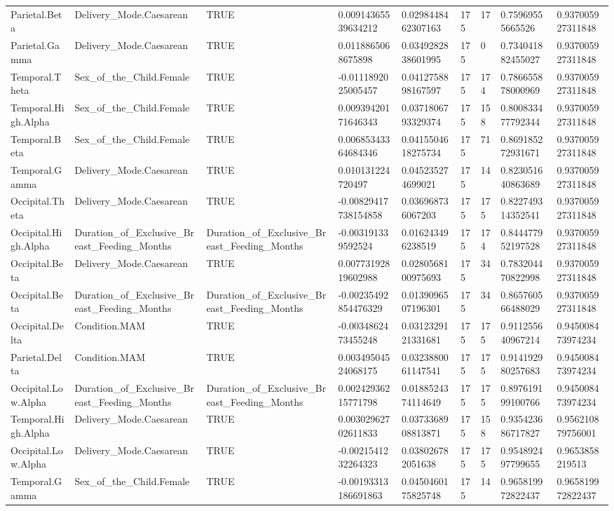 \begin{longtable}{lllllllll}
Parietal.Beta & Delivery\_Mode.Caesarean & TRUE & 0.00914365539634212 & 0.0298448462307163 & 175 & 17 & 0.75969555665526 & 0.937005927311848 \\
Parietal.Gamma & Delivery\_Mode.Caesarean & TRUE & 0.0118865068675898 & 0.0349282838601995 & 175 & 0 & 0.734041882455027 & 0.937005927311848 \\
Temporal.Theta & Sex\_of\_the\_Child.Female & TRUE & -0.0111892025005457 & 0.0412758898167597 & 175 & 174 & 0.786655878000969 & 0.937005927311848 \\
Temporal.High.Alpha & Sex\_of\_the\_Child.Female & TRUE & 0.00939420171646343 & 0.0371806793329374 & 175 & 158 & 0.800833477792344 & 0.937005927311848 \\
Temporal.Beta & Sex\_of\_the\_Child.Female & TRUE & 0.00685343364684346 & 0.0415504618275734 & 175 & 71 & 0.869185272931671 & 0.937005927311848 \\
Temporal.Gamma & Delivery\_Mode.Caesarean & TRUE & 0.010131224720497 & 0.045235274699021 & 175 & 14 & 0.823051640863689 & 0.937005927311848 \\
Occipital.Theta & Delivery\_Mode.Caesarean & TRUE & -0.00829417738154858 & 0.036968736067203 & 175 & 175 & 0.822749314352541 & 0.937005927311848 \\
Occipital.High.Alpha & Duration\_of\_Exclusive\_Breast\_Feeding\_Months & Duration\_of\_Exclusive\_Breast\_Feeding\_Months & -0.003191339592524 & 0.016243496238519 & 175 & 174 & 0.844477952197528 & 0.937005927311848 \\
Occipital.Beta & Delivery\_Mode.Caesarean & TRUE & 0.00773192819602988 & 0.0280568100975693 & 175 & 34 & 0.783204470822998 & 0.937005927311848 \\
Occipital.Beta & Duration\_of\_Exclusive\_Breast\_Feeding\_Months & Duration\_of\_Exclusive\_Breast\_Feeding\_Months & -0.00235492854476329 & 0.0139096507196301 & 175 & 34 & 0.865760566488029 & 0.937005927311848 \\
Occipital.Delta & Condition.MAM & TRUE & -0.0034862473455248 & 0.0312329121331681 & 175 & 175 & 0.911255640967214 & 0.945008473974234 \\
Parietal.Delta & Condition.MAM & TRUE & 0.00349504524068175 & 0.0323880061147541 & 175 & 175 & 0.914192980257683 & 0.945008473974234 \\
Occipital.Low.Alpha & Duration\_of\_Exclusive\_Breast\_Feeding\_Months & Duration\_of\_Exclusive\_Breast\_Feeding\_Months & 0.00242936215771798 & 0.0188524374114649 & 175 & 175 & 0.897619199100766 & 0.945008473974234 \\
Temporal.High.Alpha & Delivery\_Mode.Caesarean & TRUE & 0.00302962702611833 & 0.0373368908813871 & 175 & 158 & 0.935423686717827 & 0.956210879756001 \\
Occipital.Low.Alpha & Delivery\_Mode.Caesarean & TRUE & -0.0021541232264323 & 0.038026782051638 & 175 & 175 & 0.954892497799655 & 0.9653858219513 \\
Temporal.Gamma & Sex\_of\_the\_Child.Female & TRUE & -0.00193313186691863 & 0.0450460175825748 & 175 & 14 & 0.965819972822437 & 0.965819972822437 \\
\end{longtable}
